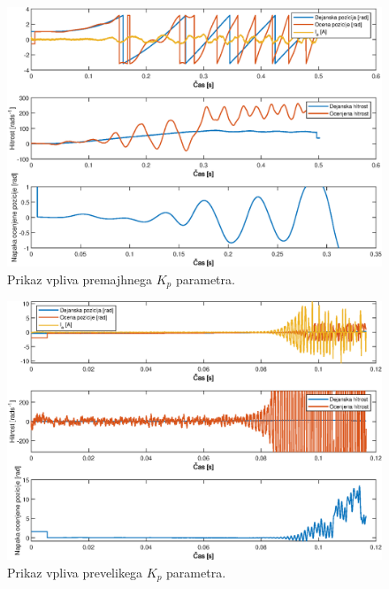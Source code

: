 \documentclass[a4paper,twoside,openright,12pt,slovene]{book}
\begin{document}
\appendix

\begin{figure}[!htbp]
    \centering
    \includegraphics[width=1\columnwidth]{Slike/PItuning_Kp_unstableLow.eps}
    \caption{\label{PItuning_Kp_unstableLow} Prikaz vpliva premajhnega $K_p$ parametra. }
\end{figure}

\begin{figure}[!htbp]
    \centering
    \includegraphics[width=1\columnwidth]{Slike/PItuning_Kp_unstableHigh.eps}
    \caption{\label{PItuning_Kp_unstableHigh} Prikaz vpliva prevelikega $K_p$ parametra. }
\end{figure}
\end{document}
